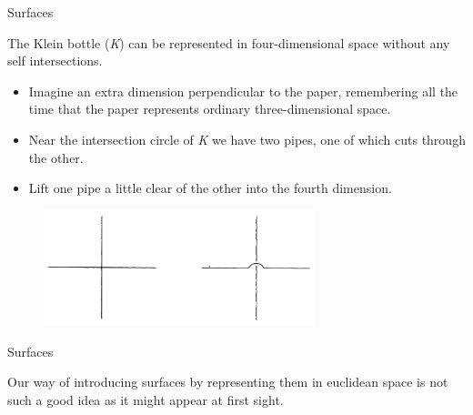 \documentclass{beamer}
\begin{document}
\begin{frame}{Surfaces}
  \begin{block}{}
    The Klein bottle (\textsl{K}) can be represented in four-dimensional space without any self intersections.
    \begin{itemize}
    \item Imagine an extra dimension perpendicular to the paper, remembering all the time that the paper represents ordinary three-dimensional space.
    \item Near the intersection circle of \textsl{K} we have two pipes, one of which cuts through the other.
    \item Lift one pipe a little clear of the other into the fourth dimension.
    \end{itemize}
  \end{block}
  \begin{figure}
    \centering
    \includegraphics[width=0.7\textwidth]{figure_1_13.png}
    \caption{}
  \end{figure}
\end{frame}

\begin{frame}{Surfaces}
  \begin{block}{}
    Our way of introducing surfaces by representing them in euclidean space is not such a good idea as it might appear at first sight.
  \end{block}
\end{frame}
\end{document}
